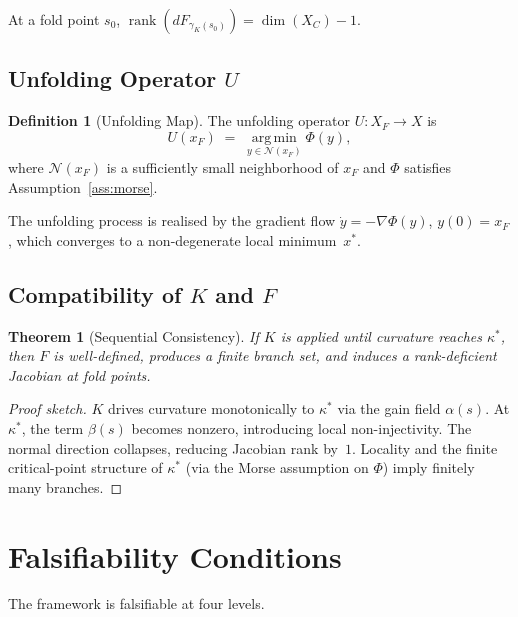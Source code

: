 \documentclass[12pt, oneside]{book}
\theoremstyle{plain}
\newtheorem{theorem}{Theorem}[section]
\theoremstyle{definition}
\newtheorem{definition}{Definition}[section]
\theoremstyle{remark}
\begin{document}
At a fold point $s_0$,
$\operatorname{rank}(dF_{\gamma_K(s_0)}) = \dim(X_C) - 1$.

\subsection{Unfolding Operator \texorpdfstring{$U$}{U}}

\begin{definition}[Unfolding Map]
The unfolding operator $U : X_F \to X$ is
\[
U(x_F) \;=\; \operatorname*{arg\,min}_{y \in \mathcal{N}(x_F)}
  \Phi(y),
\]
where $\mathcal{N}(x_F)$ is a sufficiently small neighborhood of
$x_F$ and $\Phi$ satisfies Assumption~\ref{ass:morse}.
\end{definition}

The unfolding process is realised by the gradient flow
$\dot y = -\nabla\Phi(y)$, $y(0) = x_F$, which converges to a
non-degenerate local minimum~$x^*$.

\subsection{Compatibility of \texorpdfstring{$K$}{K} and
\texorpdfstring{$F$}{F}}

\begin{theorem}[Sequential Consistency]
If $K$ is applied until curvature reaches $\kappa^*$, then $F$ is
well-defined, produces a finite branch set, and induces a
rank-deficient Jacobian at fold points.
\end{theorem}

\begin{proof}[Proof sketch]
$K$ drives curvature monotonically to $\kappa^*$ via the gain field
$\alpha(s)$. At $\kappa^*$, the term $\beta(s)$ becomes nonzero,
introducing local non-injectivity. The normal direction collapses,
reducing Jacobian rank by~$1$. Locality and the finite critical-point
structure of $\kappa^*$ (via the Morse assumption on $\Phi$) imply
finitely many branches.
\end{proof}

\section{Falsifiability Conditions}

The framework is falsifiable at four levels.
\end{document}
